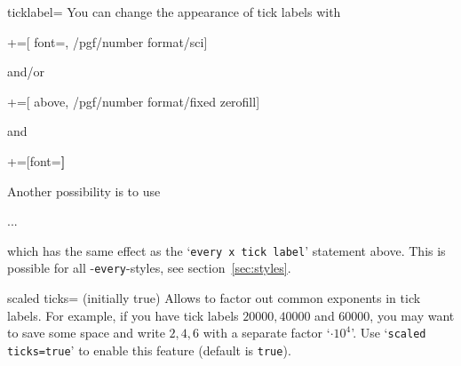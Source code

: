 \begin{pgfplotsxykey}{\x ticklabel=}
You can change the appearance of tick labels with
\begin{codeexample}
+=[
	font=\tiny,
	/pgf/number format/sci]
\end{codeexample}
and/or
\begin{codeexample}
+=[
	above,
	/pgf/number format/fixed zerofill]
\end{codeexample}
and
\begin{codeexample}
+=[font=\bfseries]
\end{codeexample}
Another possibility is to use 
\begin{codeexample}
\begin{axis}[y tick label style={above,
	/pgf/number format/fixed zerofill}
]
...
\end{axis}
\end{codeexample}
which has the same effect as the `\texttt{every x tick label}' statement above. This is possible for all \PGFPlots-\texttt{every}-styles, see section~\ref{sec:styles}.
\end{pgfplotsxykey}

\label{sec:scaled:ticks}%
\begin{pgfplotskey}{scaled ticks= (initially true)}
Allows to factor out common exponents in tick labels. For example, if you have tick labels $20000,40000$ and $60000$, you may want to save some space and write $2,4,6$ with a separate factor `$\cdot 10^4$'. Use `\texttt{scaled ticks=true}' to enable this feature (default is \texttt{true}).

\begin{codeexample}[]
%
\end{codeexample}

\begin{codeexample}[]
\end{codeexample}
\end{pgfplotskey}

